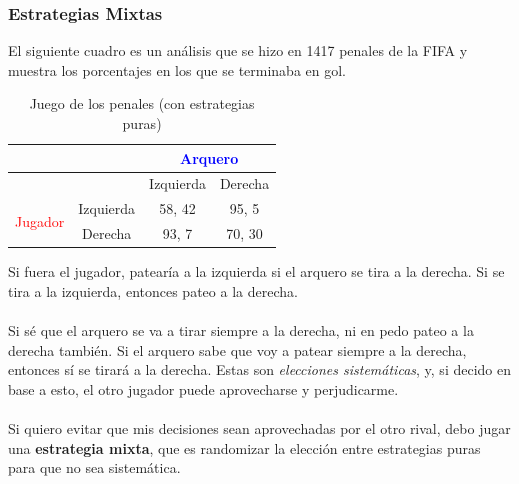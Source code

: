 \documentclass{article}
\begin{document}
            \subsubsection*{Estrategias Mixtas}
                El siguiente cuadro es un análisis que se hizo en 1417 penales de la FIFA y muestra los porcentajes en los que se terminaba en gol.
                \begin{table}[H]
                    \centering
                        \begin{tabular}{|c|c|c|c|}
                        \hline
                        & & \multicolumn{2}{c|}{\textcolor{Blue}{Arquero}} \\ \hline
                                                & & Izquierda & Derecha \\ \hline
                        \multirow{2}{*}{\textcolor{Red}{Jugador}} 
                                                & Izquierda & 58, 42 & 95, 5 \\ \cline{2-4} 
                                                & Derecha & 93, 7 & 70, 30 \\ \hline
                        \end{tabular}
                    \caption{Juego de los penales (con estrategias puras)}
                \end{table}
                Si fuera el jugador, patearía a la izquierda si el arquero se tira a la derecha. Si se tira a la izquierda, entonces pateo a la derecha. \\
                \\
                Si sé que el arquero se va a tirar siempre a la derecha, ni en pedo pateo a la derecha también. Si el arquero sabe que voy a patear siempre a la derecha, entonces sí se tirará a la derecha. Estas son \emph{elecciones sistemáticas}, y, si decido en base a esto, el otro jugador puede aprovecharse y perjudicarme. \\
                \\
                Si quiero evitar que mis decisiones sean aprovechadas por el otro rival, debo jugar una \textbf{estrategia mixta}, que es randomizar la elección entre estrategias puras para que no sea sistemática.
\end{document}
